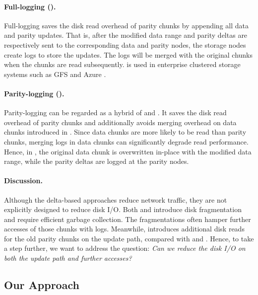 \paragraph{Full-logging (\FL).} Full-logging saves the disk read overhead of
parity chunks by appending all data and parity updates. 
That is, after the modified data
range and parity deltas are respectively sent to the corresponding data and
parity nodes, the storage nodes create logs to store the updates.  The logs
will be merged with the original chunks when the chunks are read subsequently.
\FL is used in enterprise clustered storage systems such as 
GFS \cite{ghemawat03} and Azure \cite{calder11}. 

\paragraph{Parity-logging (\PL).} Parity-logging \cite{stodolsky93,jin11}
can be regarded as a hybrid of \FO and \FL.  It saves the disk read overhead of
parity chunks and additionally avoids merging overhead on data chunks introduced in \FL.
Since data chunks are more likely to be read than parity chunks,
merging logs in data chunks can significantly degrade read 
performance. Hence, in \PL, the original data chunk is overwritten in-place with the
modified data range, while the parity deltas are logged at the parity nodes.

\paragraph{Discussion.} 
Although the delta-based approaches reduce network traffic,
they are not explicitly designed to reduce disk I/O. Both \FL
and \PL introduce disk fragmentation and require efficient garbage
collection. The fragmentations often hamper further 
accesses of those chunks with logs. Meanwhile, \FO introduces additional disk reads
for the old parity chunks on the update path, compared with \FL and \PL.
Hence, to take a step further, we want to address the question: 
\textit{Can we reduce the disk I/O on both the update path and further
accesses?}  

\subsection{Our Approach}

